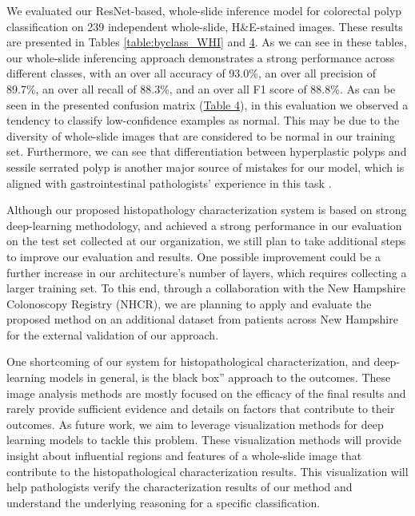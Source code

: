 \documentclass[review]{elsarticle}
\begin{document}
We evaluated our ResNet-based, whole-slide inference model for colorectal polyp classification on 239 independent whole-slide, H\&E-stained images. These results are presented in Tables \ref{table:byclass_WHI} and \hyperref[table:conf]{4}. As we can see in these tables, our whole-slide inferencing approach demonstrates a strong performance across different classes, with an over all accuracy of 93.0\%, an over all precision of 89.7\%, an over all recall of 88.3\%, and an over all F1 score of 88.8\%. As can be seen in the presented confusion matrix (\hyperref[table:conf]{Table 4}), in this evaluation we observed a tendency to classify low-confidence examples as normal. This may be due to the diversity of whole-slide images that are considered to be normal in our training set. Furthermore, we can see that differentiation between hyperplastic polyps and sessile serrated polyp is another major source of mistakes for our model, which is aligned with gastrointestinal pathologists' experience in this task \citep{vu2011individuals, irshad2014methods, veta2015assessment}.

Although our proposed histopathology characterization system is based on strong deep-learning methodology, and achieved a strong performance in our evaluation on the test set collected at our organization, we still plan to take additional steps to improve our evaluation and results. One possible improvement could be a further increase in our architecture's number of layers, which requires collecting a larger training set. To this end, through a collaboration with the New Hampshire Colonoscopy Registry (NHCR), we are planning to apply and evaluate the proposed method on an additional dataset from patients across New Hampshire for the external validation of our approach.

One shortcoming of our system for histopathological characterization, and deep-learning models in general, is the black box” approach to the outcomes. These image analysis methods are mostly focused on the efficacy of the final results and rarely provide sufficient evidence and details on factors that contribute to their outcomes. As future work, we aim to leverage visualization methods for deep learning models to tackle this problem. These visualization methods will provide insight about influential regions and features of a whole-slide image that contribute to the histopathological characterization results. This visualization will help pathologists verify the characterization results of our method and understand the underlying reasoning for a specific classification.
\end{document}
